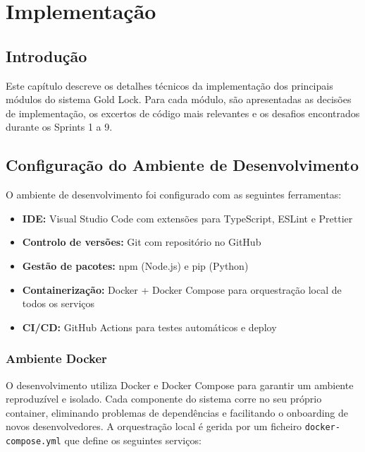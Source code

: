 \chapter{Implementação}
\label{chap:implementacao}

\section{Introdução}
\label{sec:impl-intro}

Este capítulo descreve os detalhes técnicos da implementação dos principais módulos do sistema Gold Lock. Para cada módulo, são apresentadas as decisões de implementação, os excertos de código mais relevantes e os desafios encontrados durante os Sprints 1 a 9.


\section{Configuração do Ambiente de Desenvolvimento}
\label{sec:impl-setup}

O ambiente de desenvolvimento foi configurado com as seguintes ferramentas:

\begin{itemize}
    \item \textbf{IDE:} Visual Studio Code com extensões para TypeScript, ESLint e Prettier
    \item \textbf{Controlo de versões:} Git com repositório no GitHub
    \item \textbf{Gestão de pacotes:} npm (Node.js) e pip (Python)
    \item \textbf{Containerização:} Docker + Docker Compose para orquestração local de todos os serviços
    \item \textbf{CI/CD:} GitHub Actions para testes automáticos e deploy
\end{itemize}

\subsection{Ambiente Docker}
\label{sec:impl-docker}

O desenvolvimento utiliza Docker e Docker Compose para garantir um ambiente reproduzível e isolado. Cada componente do sistema corre no seu próprio container, eliminando problemas de dependências e facilitando o onboarding de novos desenvolvedores. A orquestração local é gerida por um ficheiro \texttt{docker-compose.yml} que define os seguintes serviços:

